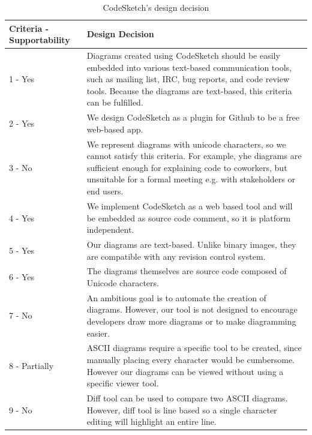 \documentclass{sig-alternate}
\begin{document}
\begin{table}[h]
\scriptsize
\begin{tabular}{|p{55px}|p{170px}|}
\hline
\textbf{Criteria - 
Supportability} & \textbf{Design Decision} \\ \hline

1 - Yes & 
Diagrams created using CodeSketch should be easily embedded into various text-based communication tools, such as mailing list, IRC, bug reports, and code review tools. Because the diagrams are text-based, this criteria can be fulfilled.
\\ \hline

2 - Yes & 
We design CodeSketch as a plugin for Github to be a free web-based app.
\\ \hline

3 - No & 
We represent diagrams with unicode characters, so we cannot satisfy this criteria. For example, yhe diagrams are sufficient enough for explaining code to coworkers, but unsuitable for a formal meeting e.g. with stakeholders or end users.
\\ \hline

4 - Yes & 
We implement CodeSketch as a web based tool and will be embedded as source code comment, so it is platform independent. 
\\ \hline

5 - Yes & 
Our diagrams are text-based. Unlike binary images, they are compatible with any revision control system.
\\ \hline

6 - Yes & 
The diagrams themselves are source code composed of Unicode characters. 
\\ \hline

7 - No & 
An ambitious goal is to automate the creation of diagrams. However, our tool is not designed to encourage developers draw more diagrams or to make diagramming easier. 
\\ \hline

8 - Partially & 
ASCII diagrams require a specific tool to be created, since manually placing every character would be cumbersome. However our diagrams can be viewed without using a specific viewer tool.
\\ \hline

9 - No & 
Diff tool can be used to compare two ASCII diagrams. However, diff tool is line based so  a single character editing will highlight an entire line. 
\\ \hline

\end{tabular}
\caption {CodeSketch's design decision}
\label{codesketch_design_decision}
\end{table}
\end{document}
